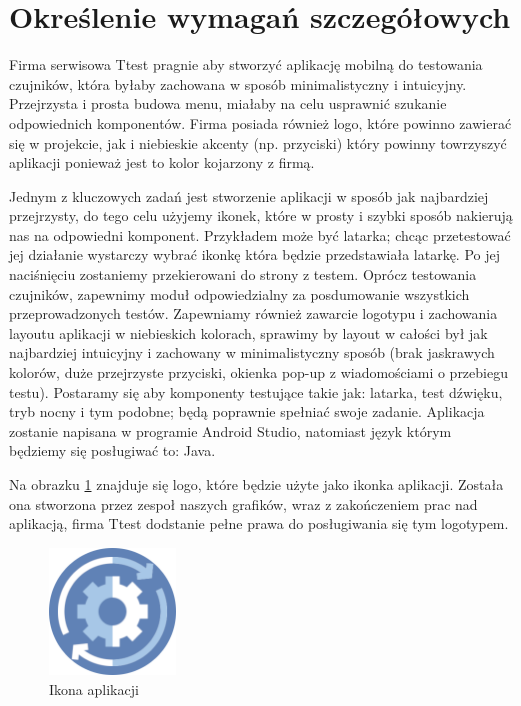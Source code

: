 \newpage
\section{Określenie wymagań szczegółowych}		%

\hspace{0.60cm}Firma serwisowa Ttest pragnie aby stworzyć aplikację mobilną do testowania czujników, która byłaby zachowana w sposób minimalistyczny i intuicyjny. Przejrzysta i prosta budowa menu, miałaby na celu usprawnić szukanie odpowiednich komponentów. Firma posiada również logo, które powinno zawierać się w projekcie, jak i niebieskie akcenty (np. przyciski) który powinny towrzyszyć aplikacji ponieważ jest to kolor kojarzony z firmą. \newline

Jednym z kluczowych zadań jest stworzenie aplikacji w sposób jak najbardziej przejrzysty, do tego celu użyjemy ikonek, które w prosty i szybki sposób nakierują nas na odpowiedni komponent. Przykładem może być latarka; chcąc przetestować jej działanie wystarczy wybrać ikonkę która będzie przedstawiała latarkę. Po jej naciśnięciu zostaniemy przekierowani do strony z testem. Oprócz testowania czujników, zapewnimy moduł odpowiedzialny za posdumowanie wszystkich przeprowadzonych testów. Zapewniamy również zawarcie logotypu i zachowania layoutu aplikacji w niebieskich kolorach, sprawimy by layout w całości był jak najbardziej intuicyjny i zachowany w minimalistyczny sposób (brak jaskrawych kolorów, duże przejrzyste przyciski, okienka pop-up z wiadomościami o przebiegu testu). Postaramy się aby komponenty testujące takie jak: latarka, test dźwięku, tryb nocny i tym podobne; będą poprawnie spełniać swoje zadanie. Aplikacja zostanie napisana w programie Android Studio, natomiast język którym będziemy się posługiwać to: Java.\newline

Na obrazku \ref{rys:ikona} znajduje się logo, które będzie użyte jako ikonka aplikacji. Została ona stworzona przez zespoł naszych grafików, wraz z zakończeniem prac nad aplikacją, firma Ttest dodstanie pełne prawa do posługiwania się tym logotypem.
\begin{figure}[!hbt]
	\begin{center}
		\includegraphics[angle=360, width=0.30\textwidth]{rys/punkt2/app_icon.png}
		\caption{Ikona aplikacji}
		\label{rys:ikona}
	\end{center}
\end{figure}

